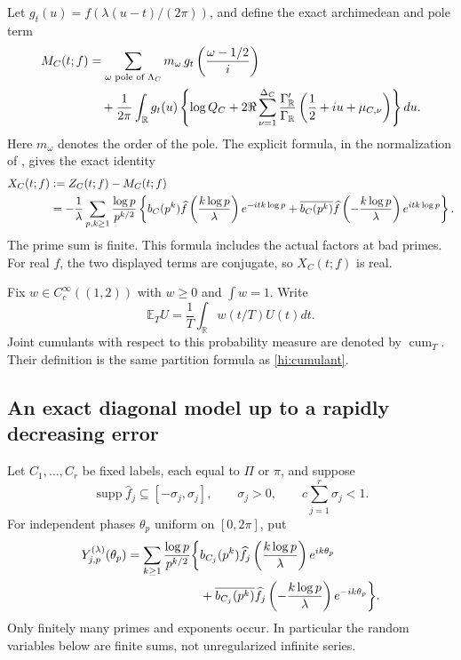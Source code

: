 \documentclass[11pt,reqno]{amsart}
\numberwithin{equation}{section}
\theoremstyle{definition}
\theoremstyle{remark}
\begin{document}
Let $g_t(u)=f(\lambda(u-t)/(2\pi))$, and define the exact archimedean and pole term
\begin{align}
 M_C(t;f)&=\sum_{\omega\text{ pole of }\Lambda_C}m_\omega\,
       g_t\left(\frac{\omega-1/2}{i}\right)\notag\\
 &\quad+\frac1{2\pi}\int_{\mathbb R}g_t(u)
 \left\{\log Q_C+
 2\Re\sum_{\nu=1}^{\Delta_C}
 \frac{\Gamma_{\mathbb R}'}{\Gamma_{\mathbb R}}
       \left(\frac12+iu+\mu_{C,\nu}\right)\right\}du.
 \label{cor:center}
\end{align}
Here $m_\omega$ denotes the order of the pole. The explicit formula, in the normalization of \cite[Proposition 2.1]{RS}, gives the exact identity
\begin{align}
 X_C(t;f)&:=Z_C(t;f)-M_C(t;f)\notag\\
 &=-\frac1\lambda\sum_{p,k\ge1}\frac{\log p}{p^{k/2}}
 \left\{b_C(p^k)\widehat f\left(\frac{k\log p}{\lambda}\right)e^{-itk\log p}
 +\overline{b_C(p^k)}\widehat f\left(-\frac{k\log p}{\lambda}\right)e^{itk\log p}\right\}.
 \label{cor:explicit}
\end{align}
The prime sum is finite. This formula includes the actual factors at bad primes. For real $f$, the two displayed terms are conjugate, so $X_C(t;f)$ is real.

Fix $w\in C_c^\infty((1,2))$ with $w\ge0$ and $\int w=1$. Write
\begin{equation}\mathbb E_T U=\frac1T\int_{\mathbb R}w(t/T)U(t)dt.\label{cor:height-average}\end{equation}
Joint cumulants with respect to this probability measure are denoted by $\operatorname{cum}_T$. Their definition is the same partition formula as \eqref{hi:cumulant}.

\subsection{An exact diagonal model up to a rapidly decreasing error}
Let $C_1,\ldots,C_r$ be fixed labels, each equal to $\Pi$ or $\pi$, and suppose
\begin{equation}\operatorname{supp}\widehat f_j\subseteq[-\sigma_j,\sigma_j],\qquad
\sigma_j>0,\qquad c\sum_{j=1}^r\sigma_j<1.\label{cor:support}\end{equation}
For independent phases $\theta_p$ uniform on $[0,2\pi]$, put
\begin{align}
Y_{j,p}^{(\lambda)}(\theta_p)
 =\sum_{k\ge1}\frac{\log p}{p^{k/2}}
 \biggl\{&b_{C_j}(p^k)\widehat f_j\left(\frac{k\log p}{\lambda}\right)e^{ik\theta_p}\notag\\
 &+\overline{b_{C_j}(p^k)}\widehat f_j\left(-\frac{k\log p}{\lambda}\right)e^{-ik\theta_p}\biggr\}.
 \label{cor:weighted-phase}
\end{align}
Only finitely many primes and exponents occur. In particular the random variables below are finite sums, not unregularized infinite series.
\end{document}
